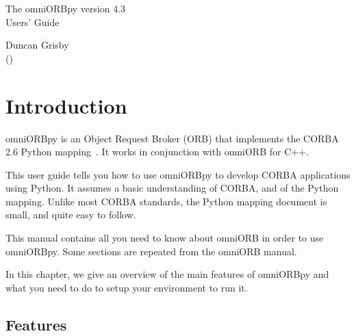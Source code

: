 \documentclass[11pt,oneside,a4paper]{book}
\begin{document}
\pagestyle{empty}

\begin{center}

\vfill

{ \Huge
The omniORBpy version 4.3\\[4mm]
Users' Guide
}

\vfill

{ \Large
Duncan Grisby\\
{\normalsize (\textit{\href{mailto:dgrisby@apasphere.com}%
                           {}})}%
                           \\[2ex]
}

\vfill

\end{center}

\cleardoublepage

\tableofcontents

\cleardoublepage

\pagestyle{headings}


\mainmatter


\chapter{Introduction}

omniORBpy is an Object Request Broker (ORB) that implements the CORBA
2.6 Python mapping~\cite{pythonmapping}. It works in conjunction with
omniORB for C++.

This user guide tells you how to use omniORBpy to develop CORBA
applications using Python. It assumes a basic understanding of CORBA,
and of the Python mapping. Unlike most CORBA standards, the Python
mapping document is small, and quite easy to follow.

This manual contains all you need to know about omniORB in order to
use omniORBpy. Some sections are repeated from the omniORB manual.

In this chapter, we give an overview of the main features of omniORBpy
and what you need to do to setup your environment to run it.

\section{Features}
\end{document}
